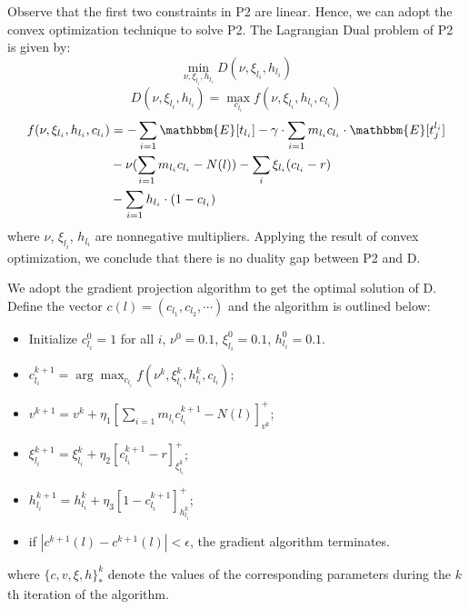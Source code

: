 \documentclass[10pt,conference]{IEEEtran}
\begin{document}
Observe that the first two constraints in P2 are linear. Hence, we can adopt the convex optimization technique to solve P2. The Lagrangian Dual problem of P2 is given by:
\begin{equation}
 \min_{\nu,\xi_{l_i},h_{l_i}}{D(\nu,\xi_{l_i},h_{l_i})}
\end{equation}
\begin{equation}
{D(\nu,\xi_{l_i},h_{l_i})}  = \max_{c_{l_i}} f(\nu,\xi_{l_i},h_{l_i},c_{l_i})
\end{equation}
\begin{equation}
\begin{split}
 f(\nu,\xi_{l_i},h_{l_i},c_{l_i}) &= - \sum_{i = 1}  \mathbbm{E}[t_{l_i}] - \gamma\cdot \sum_{i=1}  {m_{l_i} c_{l_i}} \cdot \mathbbm{E}[t^{l_i}_j]\\ & - \nu (\sum_{i=1}m_{l_i}c_{l_i}-N(l)) - \sum_{i}\xi_{l_i} (c_{l_i} - r)\\ & - \sum_{i=1}h_{l_i}\cdot(1 - c_{l_i})
\end{split}
\end{equation}
where $\nu$, $\xi_{l_i}$, $h_{l_i}$ are nonnegative multipliers. Applying the result of convex optimization, we conclude that there is no duality gap between P2 and D.

We adopt the gradient projection algorithm to get the optimal solution of D.
Define the vector $c(l) = (c_{l_1},c_{l_2},\cdots)$ and the algorithm is outlined below:
\begin{itemize}
\item Initialize $c_{l_i}^0 = 1$ for all $i$, $\nu^0 = 0.1$, $\xi_{l_i}^0 = 0.1$, $h_{l_i}^0 = 0.1$.
\item $c_{l_i}^{k+1} = \arg \max_{c_{l_i}} f(\nu^k,\xi_{l_i}^k,h_{l_i}^k,c_{l_i})$;
\item $v^{k+1} = v^k +\eta_1[\sum_{i=1}m_{l_i}c_{l_i}^{k+1}-N(l)]^+_{v^k}$;
\item $\xi_{l_i}^{k+1} = \xi_{l_i}^{k}  + \eta_2[c_{l_i}^{k+1} - r]^+_{\xi_{l_i}^{k}}$;
\item $h_{l_i}^{k+1} = h_{l_i}^{k} + \eta_3[1-c_{l_i}^{k+1}]^+_{h_{l_i}^{k}}$;
\item if $|c^{k+1}(l) - c^{k+1}(l)| < \epsilon$, the gradient algorithm terminates.
\end{itemize}
where $\{c,v,\xi,h\}_{*}^{k}$ denote the values of the corresponding parameters
during the $k$th iteration of the algorithm.
\end{document}
